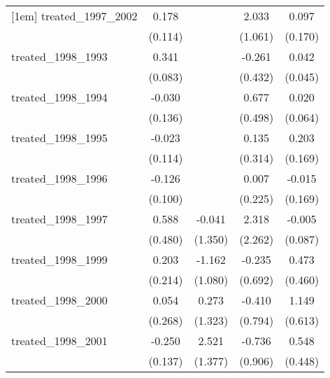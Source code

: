 {\begin{tabular}{l*{4}{c}}
[1em]
treated\_1997\_2002&       0.178         &                     &       2.033         &       0.097         \\
            &     (0.114)         &                     &     (1.061)         &     (0.170)         \\
[1em]
treated\_1998\_1993&       0.341\sym{***}&                     &      -0.261         &       0.042         \\
            &     (0.083)         &                     &     (0.432)         &     (0.045)         \\
[1em]
treated\_1998\_1994&      -0.030         &                     &       0.677         &       0.020         \\
            &     (0.136)         &                     &     (0.498)         &     (0.064)         \\
[1em]
treated\_1998\_1995&      -0.023         &                     &       0.135         &       0.203         \\
            &     (0.114)         &                     &     (0.314)         &     (0.169)         \\
[1em]
treated\_1998\_1996&      -0.126         &                     &       0.007         &      -0.015         \\
            &     (0.100)         &                     &     (0.225)         &     (0.169)         \\
[1em]
treated\_1998\_1997&       0.588         &      -0.041         &       2.318         &      -0.005         \\
            &     (0.480)         &     (1.350)         &     (2.262)         &     (0.087)         \\
[1em]
treated\_1998\_1999&       0.203         &      -1.162         &      -0.235         &       0.473         \\
            &     (0.214)         &     (1.080)         &     (0.692)         &     (0.460)         \\
[1em]
treated\_1998\_2000&       0.054         &       0.273         &      -0.410         &       1.149         \\
            &     (0.268)         &     (1.323)         &     (0.794)         &     (0.613)         \\
[1em]
treated\_1998\_2001&      -0.250         &       2.521         &      -0.736         &       0.548         \\
            &     (0.137)         &     (1.377)         &     (0.906)         &     (0.448)         \\

\end{tabular}}
